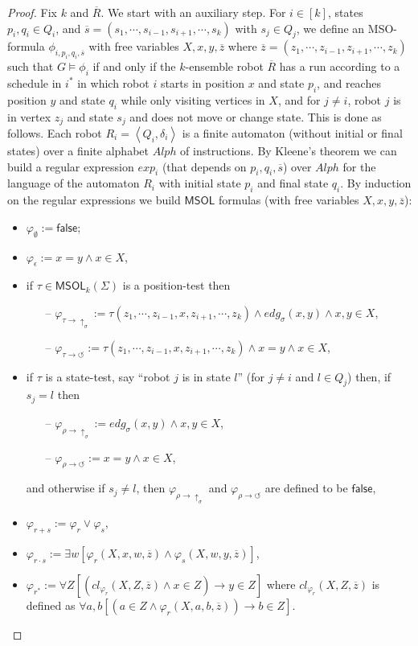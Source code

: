 \documentclass{llncs}
\newcommand{\tup}[1]{\overline{#1}}
\def\false{\textsf{false}}
\newcommand{\tpl}[1]{\left<{#1}\right>}
\def\msol{\mathsf{MSOL}}
\begin{document}
\begin{proof}
Fix $k$ and $\tup{R}$.  We start with an auxiliary step. For $i \in [k]$, states $p_i, q_i \in Q_i$, and $\tup{s} = (s_1, \cdots, s_{i-1}, s_{i+1}, \cdots, s_k)$ with $s_j \in Q_j$,  we define an MSO-formula $\phi_{i,p_i,q_i,\tup{s}}$ with free variables $X,x,y,\tup{z}$ where $\tup{z} = (z_1, \cdots, z_{i-1}, z_{i+1}, \cdots, z_k)$ such that $G \models \phi_i$ if and only if the $k$-ensemble robot $\tup{R}$ has a run according to a schedule in $i^*$ in which robot $i$ starts in position $x$ and state $p_i$, and reaches position $y$ and state $q_i$ while only visiting vertices in $X$, and for $j \neq i$, robot $j$  is in vertex $z_j$ and state $s_j$ and does not move or change state. This is done as follows. Each robot $R_i = \tpl{Q_i,\delta_i}$ is a finite automaton (without initial or final states) over a finite alphabet $Alph$ of instructions.
By Kleene's theorem we can build a regular expression $exp_i$ (that depends on $p_i,q_i,\tup{s}$) over $Alph$ for the language of the automaton $R_i$ with initial state $p_i$ and final state $q_i$.
%
By induction on the regular expressions we build $\msol$ formulas (with free variables $X,x,y,\tup{z}$):
\begin{itemize}
\item $\varphi_{\emptyset} := \false$;
\item $\varphi_{\epsilon} := x = y \wedge x \in X$,
\item if $\tau \in \msol_k(\Sigma)$ is a position-test then
\begin{itemize}
\item[--] $\varphi_{\tau \to \uparrow_\sigma} := \tau(z_1,\cdots, z_{i-1},x,z_{i+1},\cdots,z_k) \wedge edg_\sigma(x,y) \wedge x,y \in X$,
\item[--] $\varphi_{\tau \to \circlearrowleft} :=  \tau(z_1,\cdots, z_{i-1},x,z_{i+1},\cdots,z_k) \wedge x = y \wedge x \in X$,
\end{itemize}
\item if $\tau$ is a state-test, say ``robot $j$ is in state $l$'' (for $j \neq i$ and $l \in Q_j$) then, if $s_j = l$ then
\begin{itemize}
\item[--] $\varphi_{\rho \to \uparrow_\sigma} :=  edg_\sigma(x,y) \wedge x,y \in X$,
\item[--] $\varphi_{\rho \to \circlearrowleft} :=   x = y \wedge x \in X$,
\end{itemize}
and otherwise if $s_j \neq l$, then $\varphi_{\rho \to \uparrow_\sigma}$ and $\varphi_{\rho \to \circlearrowleft}$ are defined to be $\false$,
\item $\varphi_{r + s} := \varphi_{r} \vee \varphi_{s}$,
\item $\varphi_{r \cdot s} := \exists w \left[\varphi_{r}(X,x,w,\tup{z}) \wedge \varphi_{s}(X,w,y,\tup{z})\right]$,
\item $\varphi_{r^*} := \forall Z [(cl_{\varphi_r}(X,Z,\tup{z}) \wedge x \in Z) \to y \in Z]$ where
$cl_{\varphi_r}(X,Z,\tup{z})$ is defined as $\forall a,b \left[(a \in Z \wedge \varphi_r(X,a,b,\tup{z})) \to b \in Z\right]$.


\end{itemize}
\end{proof}
\end{document}
